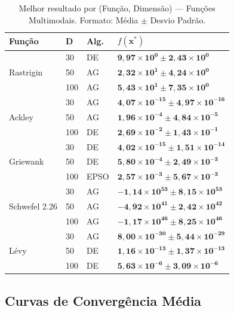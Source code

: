 \documentclass[runningheads]{llncs}
\begin{document}
\begin{table}[H]
\caption{Melhor resultado por (Função, Dimensão) — Funções Multimodais.
Formato: Média $\pm$ Desvio Padrão.}
\label{tab:multimodais}
\centering
\scriptsize
\begin{tabular}{llll}
\toprule
\textbf{Função} & \textbf{D} & \textbf{Alg.} & $f(\mathbf{x}^*)$ \\
\midrule
\multirow{3}{*}{Rastrigin}
  & 30  & DE   & $\mathbf{9{,}97 \times 10^{0} \pm 2{,}43 \times 10^{0}}$ \\
  & 50  & AG   & $\mathbf{2{,}32 \times 10^{1} \pm 4{,}24 \times 10^{0}}$ \\
  & 100 & AG   & $\mathbf{5{,}43 \times 10^{1} \pm 7{,}35 \times 10^{0}}$ \\
\midrule
\multirow{3}{*}{Ackley}
  & 30  & AG   & $\mathbf{4{,}07 \times 10^{-15} \pm 4{,}97 \times 10^{-16}}$ \\
  & 50  & AG   & $\mathbf{1{,}96 \times 10^{-4} \pm 4{,}84 \times 10^{-5}}$ \\
  & 100 & DE   & $\mathbf{2{,}69 \times 10^{-2} \pm 1{,}43 \times 10^{-1}}$ \\
\midrule
\multirow{3}{*}{Griewank}
  & 30  & DE   & $\mathbf{4{,}02 \times 10^{-15} \pm 1{,}51 \times 10^{-14}}$ \\
  & 50  & DE   & $\mathbf{5{,}80 \times 10^{-4} \pm 2{,}49 \times 10^{-3}}$ \\
  & 100 & EPSO & $\mathbf{2{,}57 \times 10^{-3} \pm 5{,}67 \times 10^{-3}}$ \\
\midrule
\multirow{3}{*}{Schwefel 2.26}
  & 30  & AG   & $\mathbf{-1{,}14 \times 10^{53} \pm 8{,}15 \times 10^{53}}$ \\
  & 50  & AG   & $\mathbf{-4{,}92 \times 10^{41} \pm 2{,}42 \times 10^{42}}$ \\
  & 100 & AG   & $\mathbf{-1{,}17 \times 10^{46} \pm 8{,}25 \times 10^{46}}$ \\
\midrule
\multirow{3}{*}{Lévy}
  & 30  & AG   & $\mathbf{8{,}00 \times 10^{-30} \pm 5{,}44 \times 10^{-29}}$ \\
  & 50  & DE   & $\mathbf{1{,}16 \times 10^{-13} \pm 1{,}37 \times 10^{-13}}$ \\
  & 100 & DE   & $\mathbf{5{,}63 \times 10^{-6} \pm 3{,}09 \times 10^{-6}}$ \\
\bottomrule
\end{tabular}
\end{table}

\subsection{Curvas de Converg\^{e}ncia M\'{e}dia}
\end{document}
